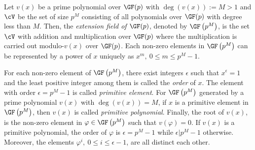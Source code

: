 Let $v(x)$ be a prime polynomial over $\GF(p)$ with $\deg(v(x)):=M>1$ and $\cV$ be the set of size $p^M$ consisting of all polynomials over $\GF(p)$ with degree less than $M$. Then, the \textit{extension field of $\GF(p)$}, denoted by $\GF\left(p^M\right)$, is the set $\cV$ with addition and multiplication over $\GF(p)$ where the multiplication is carried out modulo-$v(x)$ over $\GF(p)$.
Each non-zero elements in $\GF \left(p^M\right)$ can be represented by a power of $x$ uniquely as $x^m,~0 \leq m \leq p^M-1$. %

For each non-zero element of $\GF \left(p^M\right)$, there exist integers $\epsilon$ such that $x^{\epsilon}=1$ and the least positive integer among them is called the \textit{order} of $x$. The element with order $\epsilon=p^M-1$ is called \textit{primitive element}. For $\GF \left(p^M\right)$ generated by a prime polynomial $v(x)$ with $\deg(v(x))=M$, if $x$ is a primitive element in $\GF \left(p^M\right)$, then  $v(x)$ is called \textit{primitive polynomial}. 
%
Finally, the root of $v(x)$, is the non-zero element in $\varphi \in \GF \left(p^M\right)$ such that $v(\varphi)=0$. If $v(x)$ is a primitive polynomial, the order of $\varphi$ is $\epsilon=p^M-1$ while $\epsilon | p^M-1$ otherwise. 
Moreover, the elements $\varphi^i,~0 \leq i \leq \epsilon -1$, are all distinct each other.
 

